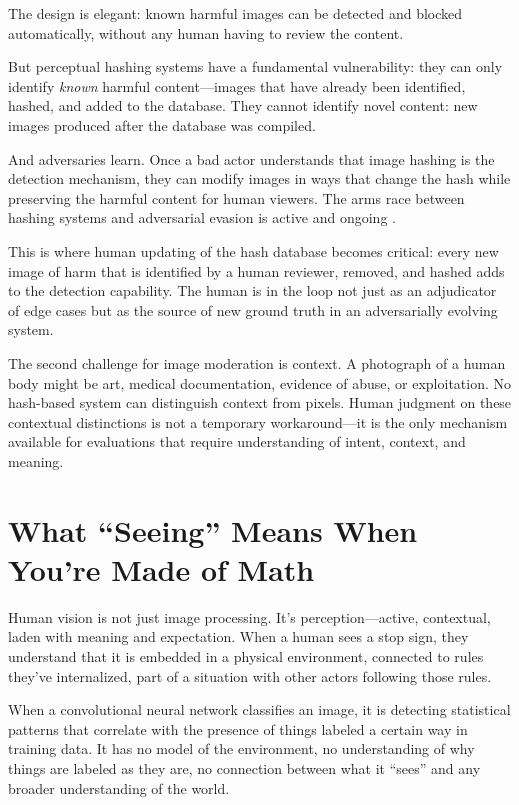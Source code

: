 The design is elegant: known harmful images can be detected and blocked automatically, without any human having to review the content.

But perceptual hashing systems have a fundamental vulnerability: they can only identify \emph{known} harmful content---images that have already been identified, hashed, and added to the database. They cannot identify novel content: new images produced after the database was compiled.

And adversaries learn. Once a bad actor understands that image hashing is the detection mechanism, they can modify images in ways that change the hash while preserving the harmful content for human viewers. The arms race between hashing systems and adversarial evasion is active and ongoing \autocite{jain2022adversarial}.

This is where human updating of the hash database becomes critical: every new image of harm that is identified by a human reviewer, removed, and hashed adds to the detection capability. The human is in the loop not just as an adjudicator of edge cases but as the source of new ground truth in an adversarially evolving system.

The second challenge for image moderation is context. A photograph of a human body might be art, medical documentation, evidence of abuse, or exploitation. No hash-based system can distinguish context from pixels. Human judgment on these contextual distinctions is not a temporary workaround---it is the only mechanism available for evaluations that require understanding of intent, context, and meaning.

\section{What ``Seeing'' Means When You're Made of Math}
\label{sec:seeing}

Human vision is not just image processing. It's perception---active, contextual, laden with meaning and expectation. When a human sees a stop sign, they understand that it is embedded in a physical environment, connected to rules they've internalized, part of a situation with other actors following those rules.

When a convolutional neural network classifies an image, it is detecting statistical patterns that correlate with the presence of things labeled a certain way in training data. It has no model of the environment, no understanding of why things are labeled as they are, no connection between what it ``sees'' and any broader understanding of the world.

